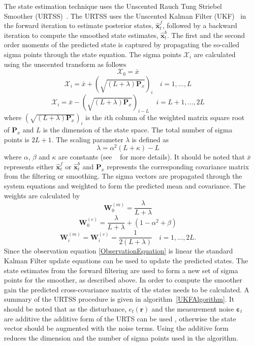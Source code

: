 \documentclass[twocolumn,11pt,a4paper]{article}		%
\begin{document}
The state estimation technique uses the Unscented Rauch Tung Striebel Smoother (URTSS)~\cite{Sarkka2010}. The URTSS uses the Unscented Kalman Filter (UKF)~\cite{Julier1997, Merwe2003} in the forward iteration to estimate posterior states, $\hat{\mathbf x}_t^{f}$, followed by a backward iteration to compute the smoothed state estimates, $\hat{\mathbf x}_t^{b}$. The first and the second order moments of the predicted state is captured by propagating the so-called sigma points through the state equation. The sigma points $\mathcal X_i$ are calculated using the unscented transform as follows
\begin{equation}\label{eq:sigmapoints1}
	\mathcal X_{0}=\bar x 
\end{equation}
\begin{equation}
	\mathcal X_{i}=\bar x+(\sqrt{( L + \lambda)\mathbf P_x})_i \quad i=1, \dots, L 
\end{equation}
\begin{equation}\label{eq:sigmapoints2}
	\mathcal X_{i}=\bar x-(\sqrt{( L + \lambda)\mathbf P_x})_{i- L} \quad i= L+1, \dots, 2 L 
\end{equation}
where $(\sqrt{( L + \lambda)\mathbf P_x})_i$ is the $i$th column of the weighted matrix square root of  $\mathbf P_x$ and  $L$ is the dimension of the state space. The total number of sigma points is $2L+1$. The scaling parameter $\lambda$ is defined as 
\begin{equation}\label{eq:sigmapoints3}
	\lambda=\alpha^2( L+\kappa)- L 
\end{equation}
where $\alpha$, $\beta$ and $\kappa$ are constants (see ~\cite{Haykin2001} for more details). It should be noted that $\bar x$ represents either $\hat{\mathbf x}_t^{f}$ or $\hat{\mathbf x}_t^{b}$ and $\mathbf{P}_x$ represents the corresponding covariance matrix from the filtering or smoothing. The sigma vectors are propagated through the system equations and weighted to form the predicted mean and covariance. The weights are calculated by 
\begin{equation}
	\mathbf W_0^{(m)}=\frac{\lambda}{ L+\lambda} 
\end{equation}
\begin{equation}
	\mathbf W_0^{(c)}=\frac{\lambda}{ L+\lambda}+(1-\alpha^2+\beta) 
\end{equation}
\begin{equation}
	\mathbf W_i^{(m)}=\mathbf W_i^{(c)}=\frac{1}{2( L+\lambda)} \quad i=1, \dots, 2L. 
\end{equation}
Since the observation equation \ref{ObservationEquation} is linear the standard Kalman Filter update equations can be used to update the predicted states. The state estimates from the forward filtering are used to form a new set of sigma points for the smoother, as described above. In order to compute the smoother gain the predicted cross-covariance matrix of the states needs to be calculated. A summary of the URTSS procedure is given in algorithm~\ref{UKFAlgorithm}. It should be noted that as the disturbance, $e_t\left(\mathbf{r}\right)$ and the measurement noise $ \boldsymbol{\varepsilon}_t$ are additive the additive form of the URTS can be used , otherwise the state vector should be augmented with the noise terms. Using the additive form reduces the dimension and the number of sigma points used in the algorithm.
\end{document}
